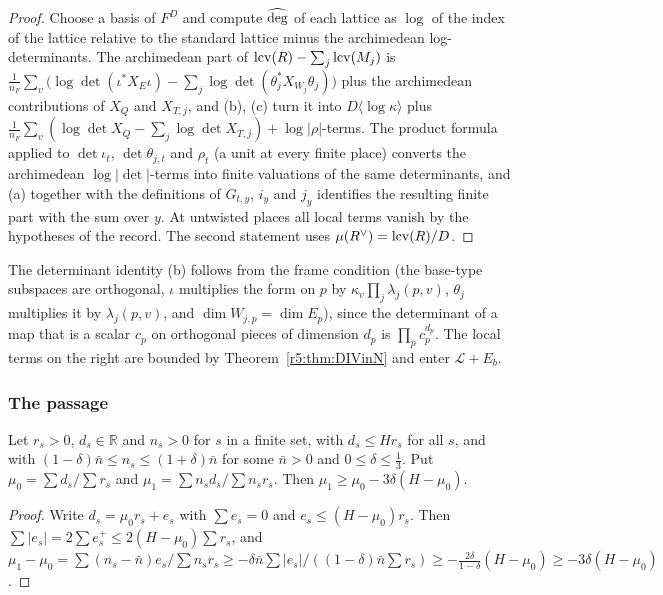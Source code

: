 \begin{proof}
Choose a basis of $F^D$ and compute $\widehat{\deg}$ of each lattice as $\log$ of the index of the lattice relative to the standard lattice minus the archimedean log-determinants. The archimedean part of $\operatorname{lcv}(R)-\sum_j\operatorname{lcv}(M_j)$ is $\frac1{n_F}\sum_v\big(\log\det(\iota^*X_E\iota)-\sum_j\log\det(\theta_j^*X_{W_j}\theta_j)\big)$ plus the archimedean contributions of $X_{Q}$ and $X_{T,j}$, and (b), (c) turn it into $D\langle\log\kappa\rangle$ plus $\frac1{n_F}\sum_v(\log\det X_Q-\sum_j\log\det X_{T,j})+\log\lvert\rho\rvert$-terms. The product formula applied to $\det\iota_t$, $\det\theta_{j,t}$ and $\rho_t$ (a unit at every finite place) converts the archimedean $\log\lvert\det\rvert$-terms into finite valuations of the same determinants, and (a) together with the definitions of $G_{t,y}$, $i_y$ and $j_y$ identifies the resulting finite part with the sum over $y$. At untwisted places all local terms vanish by the hypotheses of the record. The second statement uses $\mu(R^\vee)=\operatorname{lcv}(R)/D$.
\end{proof}

The determinant identity (b) follows from the frame condition (the base-type subspaces are orthogonal, $\iota$ multiplies the form on $p$ by $\kappa_v\prod_j\lambda_j(p,v)$, $\theta_j$ multiplies it by $\lambda_j(p,v)$, and $\dim W_{j,p}=\dim E_p$), since the determinant of a map that is a scalar $c_p$ on orthogonal pieces of dimension $d_p$ is $\prod_pc_p^{d_p}$. The local terms on the right are bounded by Theorem~\ref{r5:thm:DIVinN} and enter $\mathcal L+E_b$.

\subsubsection{The passage}

\begin{lemma}[averaging]\label{w3:W3:avg}
Let $r_s>0$, $d_s\in\mathbb R$ and $n_s>0$ for $s$ in a finite set, with $d_s\le Hr_s$ for all $s$, and with $(1-\delta)\bar n\le n_s\le(1+\delta)\bar n$ for some $\bar n>0$ and $0\le\delta\le\frac13$. Put $\mu_0=\sum d_s/\sum r_s$ and $\mu_1=\sum n_sd_s/\sum n_sr_s$. Then $\mu_1\ge\mu_0-3\delta(H-\mu_0)$.
\end{lemma}

\begin{proof}
Write $d_s=\mu_0r_s+e_s$ with $\sum e_s=0$ and $e_s\le(H-\mu_0)r_s$. Then $\sum\lvert e_s\rvert=2\sum e_s^+\le2(H-\mu_0)\sum r_s$, and $\mu_1-\mu_0=\sum(n_s-\bar n)e_s/\sum n_sr_s\ge-\delta\bar n\sum\lvert e_s\rvert/((1-\delta)\bar n\sum r_s)\ge-\frac{2\delta}{1-\delta}(H-\mu_0)\ge-3\delta(H-\mu_0)$.
\end{proof}

